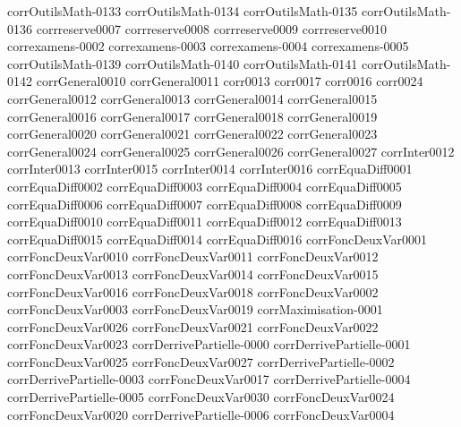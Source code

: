 {corrOutilsMath-0133}
{corrOutilsMath-0134}
{corrOutilsMath-0135}
{corrOutilsMath-0136}
{corrreserve0007}
{corrreserve0008}
{corrreserve0009}
{corrreserve0010}
{correxamens-0002}
{correxamens-0003}
{correxamens-0004}
{correxamens-0005}
{corrOutilsMath-0139}
{corrOutilsMath-0140}
{corrOutilsMath-0141}
{corrOutilsMath-0142}
{corrGeneral0010}
{corrGeneral0011}
{corr0013}
{corr0017}
{corr0016}
{corr0024}
{corrGeneral0012}
{corrGeneral0013}
{corrGeneral0014}
{corrGeneral0015}
{corrGeneral0016}
{corrGeneral0017}
{corrGeneral0018}
{corrGeneral0019}
{corrGeneral0020}
{corrGeneral0021}
{corrGeneral0022}
{corrGeneral0023}
{corrGeneral0024}
{corrGeneral0025}
{corrGeneral0026}
{corrGeneral0027}
{corrInter0012}
{corrInter0013}
{corrInter0015}
{corrInter0014}
{corrInter0016}
{corrEquaDiff0001}
{corrEquaDiff0002}
{corrEquaDiff0003}
{corrEquaDiff0004}
{corrEquaDiff0005}
{corrEquaDiff0006}
{corrEquaDiff0007}
{corrEquaDiff0008}
{corrEquaDiff0009}
{corrEquaDiff0010}
{corrEquaDiff0011}
{corrEquaDiff0012}
{corrEquaDiff0013}
{corrEquaDiff0015}
{corrEquaDiff0014}
{corrEquaDiff0016}
{corrFoncDeuxVar0001}
{corrFoncDeuxVar0010}
{corrFoncDeuxVar0011}
{corrFoncDeuxVar0012}
{corrFoncDeuxVar0013}
{corrFoncDeuxVar0014}
{corrFoncDeuxVar0015}
{corrFoncDeuxVar0016}
{corrFoncDeuxVar0018}
{corrFoncDeuxVar0002}
{corrFoncDeuxVar0003}
{corrFoncDeuxVar0019}
{corrMaximisation-0001}
{corrFoncDeuxVar0026}
{corrFoncDeuxVar0021}
{corrFoncDeuxVar0022}
{corrFoncDeuxVar0023}
{corrDerrivePartielle-0000}
{corrDerrivePartielle-0001}
{corrFoncDeuxVar0025}
{corrFoncDeuxVar0027}
{corrDerrivePartielle-0002}
{corrDerrivePartielle-0003}
{corrFoncDeuxVar0017}
{corrDerrivePartielle-0004}
{corrDerrivePartielle-0005}
{corrFoncDeuxVar0030}
{corrFoncDeuxVar0024}
{corrFoncDeuxVar0020}
{corrDerrivePartielle-0006}
{corrFoncDeuxVar0004}
